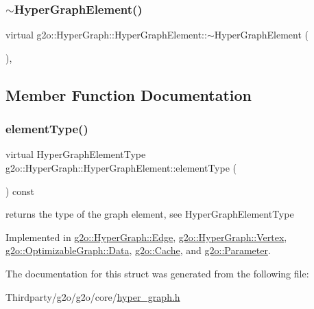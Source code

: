 \subsubsection{\texorpdfstring{$\sim$\+Hyper\+Graph\+Element()}{~HyperGraphElement()}}
{\footnotesize\ttfamily virtual g2o\+::\+Hyper\+Graph\+::\+Hyper\+Graph\+Element\+::$\sim$\+Hyper\+Graph\+Element (\begin{DoxyParamCaption}{ }\end{DoxyParamCaption})\hspace{0.3cm}{\ttfamily [inline]}, {\ttfamily [virtual]}}



\subsection{Member Function Documentation}
\mbox{\label{structg2o_1_1_hyper_graph_1_1_hyper_graph_element_a1a9d7b748698c09d202373e06e413ef2}} 
\subsubsection{\texorpdfstring{element\+Type()}{elementType()}}
{\footnotesize\ttfamily virtual Hyper\+Graph\+Element\+Type g2o\+::\+Hyper\+Graph\+::\+Hyper\+Graph\+Element\+::element\+Type (\begin{DoxyParamCaption}{ }\end{DoxyParamCaption}) const\hspace{0.3cm}{\ttfamily [pure virtual]}}

returns the type of the graph element, see Hyper\+Graph\+Element\+Type 

Implemented in \mbox{\hyperlink{classg2o_1_1_hyper_graph_1_1_edge_a04f1b4d408aebdf14ac3f0cfd247b776}{g2o\+::\+Hyper\+Graph\+::\+Edge}}, \mbox{\hyperlink{classg2o_1_1_hyper_graph_1_1_vertex_a8f214b9065b88a3aafff7442380476ab}{g2o\+::\+Hyper\+Graph\+::\+Vertex}}, \mbox{\hyperlink{classg2o_1_1_optimizable_graph_1_1_data_aa98d48f62d4c620cb62fbaeb1775389b}{g2o\+::\+Optimizable\+Graph\+::\+Data}}, \mbox{\hyperlink{classg2o_1_1_cache_ace402a9e59f3fe28ae7e44854cbc5e97}{g2o\+::\+Cache}}, and \mbox{\hyperlink{classg2o_1_1_parameter_a44ace751794dcde7a5fd52d16e2f4f21}{g2o\+::\+Parameter}}.



The documentation for this struct was generated from the following file\+:\begin{DoxyCompactItemize}
\item 
Thirdparty/g2o/g2o/core/\mbox{\hyperlink{hyper__graph_8h}{hyper\+\_\+graph.\+h}}\end{DoxyCompactItemize}
